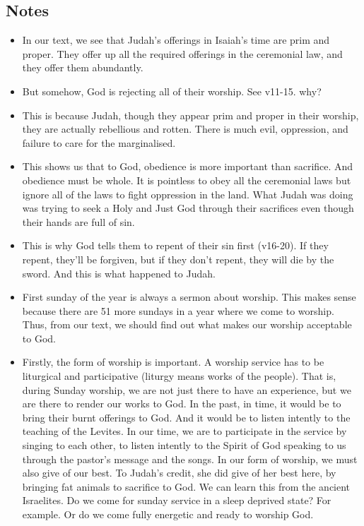 \subsection*{Notes}
\begin{itemize}
  \item{In our text, we see that Judah’s offerings in Isaiah’s time are prim and proper. They offer up all the required offerings in the ceremonial law, and they offer them abundantly.}
  \item{But somehow, God is rejecting all of their worship. See v11-15. why?}
  \item{This is because Judah, though they appear prim and proper in their worship, they are actually rebellious and rotten. There is much evil, oppression, and failure to care for the marginalised.}
  \item{This shows us that to God, obedience is more important than sacrifice. And obedience must be whole. It is pointless to obey all the ceremonial laws but ignore all of the laws to fight oppression in the land. What Judah was doing was trying to seek a Holy and Just God through their sacrifices even though their hands are full of sin.}
  \item{This is why God tells them to repent of their sin first (v16-20). If they repent, they’ll be forgiven, but if they don’t repent, they will die by the sword. And this is what happened to Judah.}
  \item{First sunday of the year is always a sermon about worship. This makes sense because there are 51 more sundays in a year where we come to worship. Thus, from our text, we should find out what makes our worship acceptable to God.}
  \item{Firstly, the form of worship is important. A worship service has to be liturgical and participative (liturgy means works of the people). That is, during Sunday worship, we are not just there to have an experience, but we are there to render our works to God. In the past, in time, it would be to bring their burnt offerings to God. And it would be to listen intently to the teaching of the Levites. In our time, we are to participate in the service by singing to each other, to listen intently to the Spirit of God speaking to us through the pastor’s message and the songs. In our form of worship, we must also give of our best. To Judah’s credit, she did give of her best here, by bringing fat animals to sacrifice to God. We can learn this from the ancient Israelites. Do we come for sunday service in a sleep deprived state? For example. Or do we come fully energetic and ready to worship God.}

\end{itemize}
